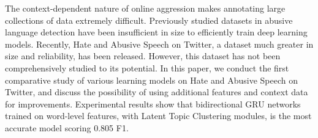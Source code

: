 The context-dependent nature of online aggression makes annotating large collections of data extremely difficult. Previously studied datasets in abusive language detection have been insufficient in size to efficiently train deep learning models. Recently, Hate and Abusive Speech on Twitter, a dataset much greater in size and reliability, has been released. However, this dataset has not been comprehensively studied to its potential. In this paper, we conduct the first comparative study of various learning models on Hate and Abusive Speech on Twitter, and discuss the possibility of using additional features and context data for improvements. Experimental results show that bidirectional GRU networks trained on word-level features, with Latent Topic Clustering modules, is the most accurate model scoring 0.805 F1.
